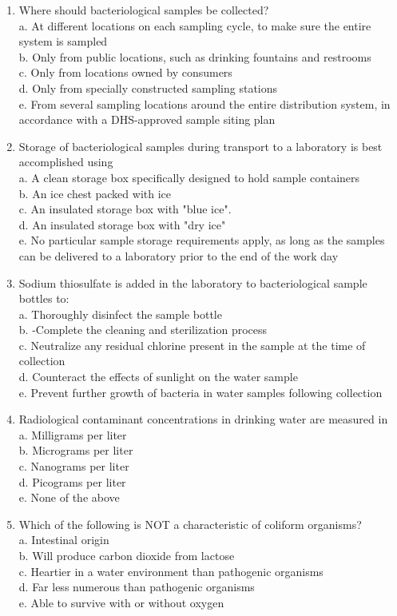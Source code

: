 \begin{enumerate}[1.]
\item Where should bacteriological samples be collected?\\
a. At different locations on each sampling cycle, to make sure the entire system is sampled\\
b. Only from public locations, such as drinking fountains and restrooms\\
c. Only from locations owned by consumers\\
d. Only from specially constructed sampling stations\\
e. From several sampling locations around the entire distribution system, in accordance with a DHS-approved sample siting plan\\
\item Storage of bacteriological samples during transport to a laboratory is best accomplished using\\
a. A clean storage box specifically designed to hold sample containers\\
b. An ice chest packed with ice\\
c. An insulated storage box with "blue ice".\\
d. An insulated storage box with "dry ice"\\
e. No particular sample storage requirements apply, as long as the samples can be delivered to a laboratory prior to the end of the work day\\
  \item Sodium thiosulfate is added in the laboratory to bacteriological sample bottles to:\\
a. Thoroughly disinfect the sample bottle\\
b. -Complete the cleaning and sterilization process\\
c. Neutralize any residual chlorine present in the sample at the time of collection\\
d. Counteract the effects of sunlight on the water sample\\
e. Prevent further growth of bacteria in water samples following collection\\
  \item Radiological contaminant concentrations in drinking water are measured in\\
a. Milligrams per liter\\
b. Micrograms per liter\\
c. Nanograms per liter\\
d. Picograms per liter\\
e. None of the above\\
  \item Which of the following is NOT a characteristic of coliform organisms?\\
a. Intestinal origin\\
b. Will produce carbon dioxide from lactose\\
c. Heartier in a water environment than pathogenic organisms\\
d. Far less numerous than pathogenic organisms\\
e. Able to survive with or without oxygen\\


\end{enumerate}

